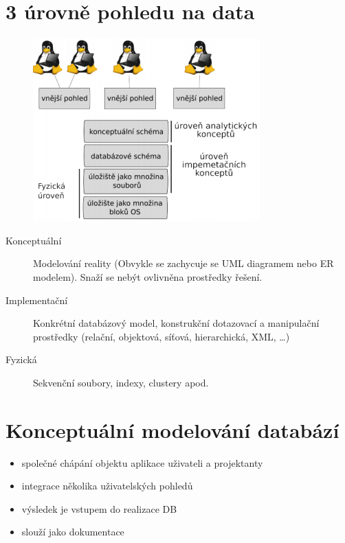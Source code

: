 \documentclass{szzclass}
\begin{document}
\section{3 úrovně pohledu na data}
\begin{figure}[h!]
  \centering
  \includegraphics[width = \textwidth]{topics/bi-spol-11/images/views.png}
\end{figure}
\begin{description}
  \item[Konceptuální] Modelování reality (Obvykle se zachycuje se UML diagramem nebo ER modelem). Snaží se nebýt ovlivněna prostředky řešení.
  \item[Implementační] Konkrétní databázový model, konstrukční dotazovací a manipulační prostředky (relační, objektová, síťová, hierarchická, XML, \dots)
  \item[Fyzická] Sekvenční soubory, indexy, clustery apod.
\end{description}

\section{Konceptuální modelování databází}
\begin{itemize}
  \item společné chápání objektu aplikace uživateli a projektanty
  \item integrace několika uživatelských pohledů
  \item výsledek je vstupem do realizace DB
  \item slouží jako dokumentace
\end{itemize}
\end{document}
